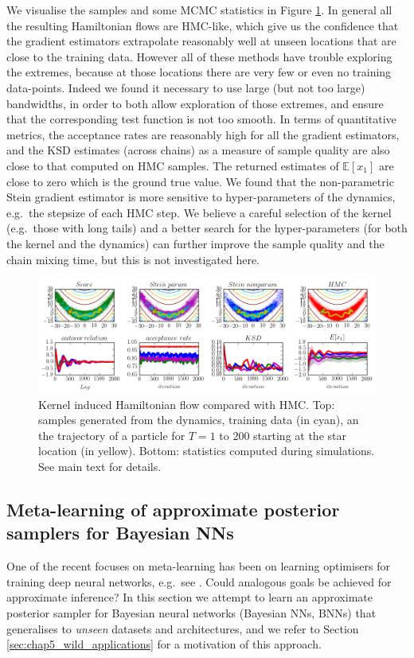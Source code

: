 We visualise the samples and some MCMC statistics in Figure \ref{fig:banana_example}. 
%
In general all the resulting Hamiltonian flows
are HMC-like, which give us the confidence that the gradient estimators extrapolate reasonably well at unseen locations that are close to the training data. However all of these methods have trouble exploring the extremes, because at those locations there are very few or even no training data-points. Indeed we found it necessary to use large (but not too large) bandwidths, in order to both allow exploration of those extremes, and ensure that the corresponding test function is not too smooth. In terms of quantitative metrics, the acceptance rates are reasonably high for all the gradient estimators, and the KSD estimates (across chains) as a measure of sample quality are also close to that computed on HMC samples. The returned estimates of $\mathbb{E}[x_1]$ are close to zero which is the ground true value. We found that the non-parametric Stein gradient estimator is more sensitive to hyper-parameters of the dynamics, e.g.~the stepsize of each HMC step.
%
We believe a careful selection of the kernel (e.g.~those with long tails) and a better search
for the hyper-parameters (for both the kernel and the dynamics) can further improve the
sample quality and the chain mixing time, but this is not investigated here.

\begin{figure}[t]
\vspace{-0.15in}
\includegraphics[width=1.0\linewidth]{figs/banana.png}
\vspace{-0.2in}
\caption{Kernel induced Hamiltonian flow compared with HMC. Top: samples generated from the dynamics, training data (in cyan), an the trajectory of a particle for $T=1$ to $200$ starting at the star location (in yellow). Bottom: statistics computed during simulations. See main text for details.}
\vspace{-0.1in}
\label{fig:banana_example}
\end{figure}

\subsection{Meta-learning of approximate posterior samplers for Bayesian NNs}
\label{sec:chap6_meta}
%
One of the recent focuses on meta-learning has been on learning optimisers for training deep neural networks, e.g.~see \cite{andrychowicz:gradient2016, li:optimize2016}. Could analogous goals be achieved for approximate inference? In this section we attempt to learn an approximate posterior sampler for Bayesian neural networks (Bayesian NNs, BNNs) that generalises to \emph{unseen} datasets and architectures, and we refer to Section \ref{sec:chap5_wild_applications} for a motivation of this approach. 

